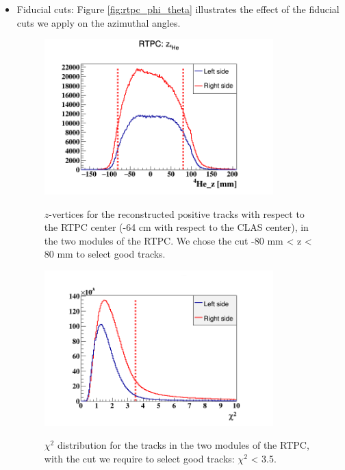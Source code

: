 \begin{itemize}
\item Fiducial cuts: Figure \ref{fig:rtpc_phi_theta} illustrates the effect of 
   the fiducial cuts we apply on the azimuthal angles. 

\begin{figure}[tbp]
\begin{minipage}[c]{.46\linewidth}
\hspace{-0.3in}
\includegraphics[height=6.0cm]{fig_analysis/rtpc_z.png}
\caption{ $z$-vertices for the reconstructed positive tracks with respect to 
the RTPC center (-64 cm with respect to the CLAS center), in the two modules of 
the RTPC. We chose the cut -80  mm < z < 80 mm to select good tracks.} 
\label{fig:rtpc_z}
\end{minipage} \hfill
\begin{minipage}[c]{.46\linewidth}
\hspace{-0.3in}
\includegraphics[height=6.0cm]{fig_analysis/rtpc_X2.png}
\caption{$\chi^{2}$ distribution for the tracks in the two modules of the RTPC, with the cut we require to select good tracks: $\chi^{2}$ < 3.5.}
\vspace{0.5in}
\label{fig:rtpc_X2}
\end{minipage}
\end{figure}


\end{itemize}
